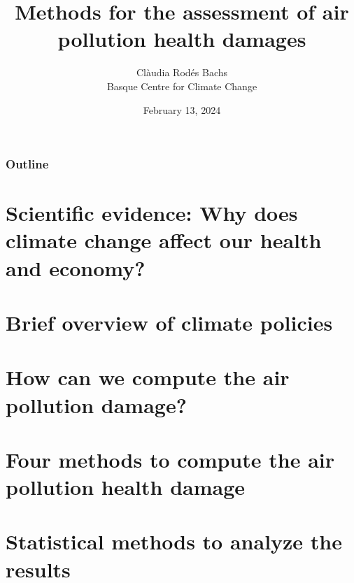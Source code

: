 \documentclass{beamer}
\title[Air pollution health damages]{Methods for the assessment of air pollution health damages}
\author[Clàudia Rodés Bachs - BC3]{Clàudia Rodés Bachs\\[3mm]Basque Centre for Climate Change}
\date{February 13, 2024}
\begin{document}
\begin{frame}
\titlepage 
{}
\end{frame}

\begin{frame}
\frametitle{Outline}
\tableofcontents 
\end{frame}


\section{Scientific evidence: Why does climate change affect our health and economy?} 



\section{Brief overview of climate policies} 



\section{How can we compute the air pollution damage?} 



\section{Four methods to compute the air pollution health damage} 



\section{Statistical methods to analyze the results} 


\end{document}
